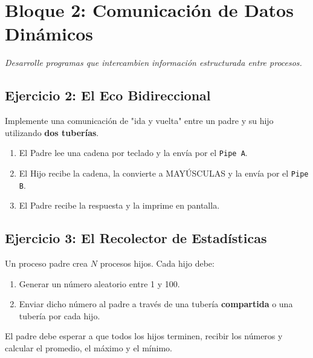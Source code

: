 \documentclass[12pt,a4paper]{article}
\begin{document}
\newpage

\section*{Bloque 2: Comunicación de Datos Dinámicos}
\textit{Desarrolle programas que intercambien información estructurada entre procesos.}

\subsection*{Ejercicio 2: El Eco Bidireccional}
Implemente una comunicación de "ida y vuelta" entre un padre y su hijo utilizando \textbf{dos tuberías}.
\begin{enumerate}
    \item El Padre lee una cadena por teclado y la envía por el \texttt{Pipe A}.
    \item El Hijo recibe la cadena, la convierte a MAYÚSCULAS y la envía por el \texttt{Pipe B}.
    \item El Padre recibe la respuesta y la imprime en pantalla.
\end{enumerate}

\begin{center}
\end{center}

\newpage

\subsection*{Ejercicio 3: El Recolector de Estadísticas}
Un proceso padre crea $N$ procesos hijos. Cada hijo debe:
\begin{enumerate}
    \item Generar un número aleatorio entre 1 y 100.
    \item Enviar dicho número al padre a través de una tubería \textbf{compartida} o una tubería por cada hijo.
\end{enumerate}
El padre debe esperar a que todos los hijos terminen, recibir los números y calcular el promedio, el máximo y el mínimo.
\end{document}
